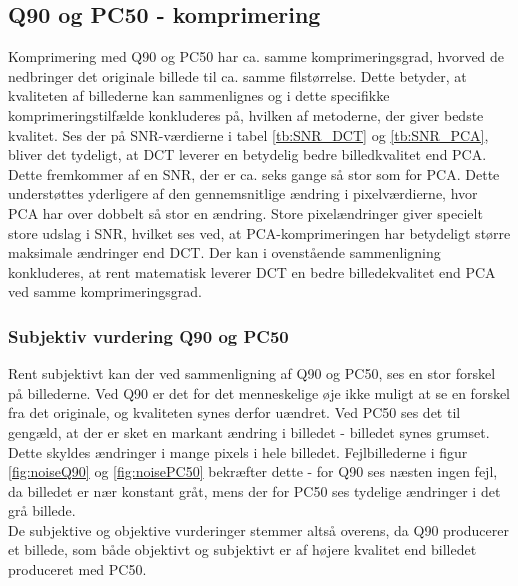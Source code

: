 \subsection*{Q90 og PC50 - komprimering}
Komprimering med Q90 og PC50 har ca. samme komprimeringsgrad, hvorved de nedbringer det originale billede til ca. samme filstørrelse. Dette betyder, at kvaliteten af billederne kan sammenlignes og i dette specifikke komprimeringstilfælde konkluderes på, hvilken af metoderne, der giver bedste kvalitet. Ses der på SNR-værdierne i tabel \ref{tb:SNR_DCT} og \vref{tb:SNR_PCA}, bliver det tydeligt, at DCT leverer en betydelig  bedre billedkvalitet end PCA. Dette fremkommer af en SNR, der er ca. seks gange så stor som for PCA. Dette understøttes yderligere af den gennemsnitlige ændring i pixelværdierne, hvor PCA har over dobbelt så stor en ændring. Store pixelændringer giver specielt store udslag i SNR, hvilket ses ved, at PCA-komprimeringen har betydeligt større maksimale ændringer end DCT. Der kan i ovenstående sammenligning konkluderes, at rent matematisk leverer DCT en bedre billedekvalitet end PCA ved samme komprimeringsgrad.

\subsubsection{Subjektiv vurdering Q90 og PC50}
Rent subjektivt kan der ved sammenligning af Q90 og PC50, ses en stor forskel på billederne. Ved Q90 er det for det menneskelige øje ikke muligt at se en forskel fra det originale, og kvaliteten synes derfor uændret. Ved PC50 ses det til gengæld, at der er sket en markant ændring i billedet - billedet synes grumset. Dette skyldes ændringer i mange pixels i hele billedet. Fejlbillederne i figur \ref{fig:noiseQ90} og \ref{fig:noisePC50} bekræfter dette - for Q90 ses næsten ingen fejl, da billedet er nær konstant gråt, mens der for PC50 ses tydelige ændringer i det grå billede.\\
De subjektive og objektive vurderinger stemmer altså overens, da Q90 producerer et billede, som både objektivt og subjektivt er af højere kvalitet end billedet produceret med PC50.

